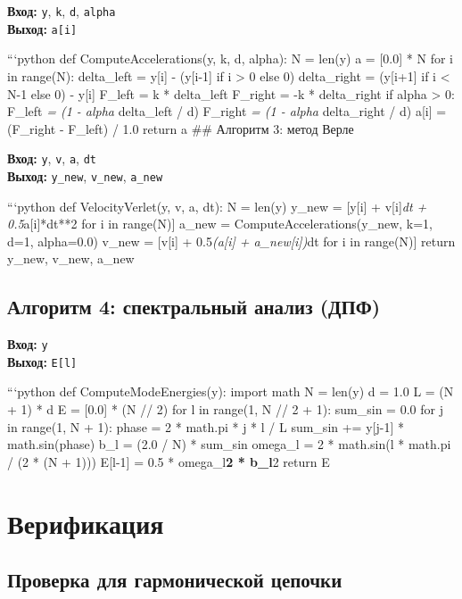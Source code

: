 \documentclass[
  12pt,
  a4paper,
  DIV=11,
  numbers=noendperiod]{scrreprt}
\begin{document}
\textbf{Вход:} \texttt{y}, \texttt{k}, \texttt{d}, \texttt{alpha}\\
\textbf{Выход:} \texttt{a{[}i{]}}

```python def ComputeAccelerations(y, k, d, alpha): N = len(y) a =
{[}0.0{]} * N for i in range(N): delta\_left = y{[}i{]} - (y{[}i-1{]} if
i \textgreater{} 0 else 0) delta\_right = (y{[}i+1{]} if i \textless{}
N-1 else 0) - y{[}i{]} F\_left = k * delta\_left F\_right = -k *
delta\_right if alpha \textgreater{} 0: F\_left \emph{= (1 - alpha }
delta\_left / d) F\_right \emph{= (1 - alpha } delta\_right / d)
a{[}i{]} = (F\_right - F\_left) / 1.0 return a \#\# Алгоритм 3: метод
Верле

\textbf{Вход:} \texttt{y}, \texttt{v}, \texttt{a}, \texttt{dt}\\
\textbf{Выход:} \texttt{y\_new}, \texttt{v\_new}, \texttt{a\_new}

```python def VelocityVerlet(y, v, a, dt): N = len(y) y\_new =
{[}y{[}i{]} + v{[}i{]}\emph{dt + 0.5}a{[}i{]}*dt**2 for i in range(N){]}
a\_new = ComputeAccelerations(y\_new, k=1, d=1, alpha=0.0) v\_new =
{[}v{[}i{]} + 0.5\emph{(a{[}i{]} + a\_new{[}i{]})}dt for i in
range(N){]} return y\_new, v\_new, a\_new

\section{Алгоритм 4: спектральный анализ
(ДПФ)}\label{ux430ux43bux433ux43eux440ux438ux442ux43c-4-ux441ux43fux435ux43aux442ux440ux430ux43bux44cux43dux44bux439-ux430ux43dux430ux43bux438ux437-ux434ux43fux444}

\textbf{Вход:} \texttt{y}\\
\textbf{Выход:} \texttt{E{[}l{]}}

```python def ComputeModeEnergies(y): import math N = len(y) d = 1.0 L =
(N + 1) * d E = {[}0.0{]} * (N // 2) for l in range(1, N // 2 + 1):
sum\_sin = 0.0 for j in range(1, N + 1): phase = 2 * math.pi * j * l / L
sum\_sin += y{[}j-1{]} * math.sin(phase) b\_l = (2.0 / N) * sum\_sin
omega\_l = 2 * math.sin(l * math.pi / (2 * (N + 1))) E{[}l-1{]} = 0.5 *
omega\_l\textbf{2 * b\_l}2 return E

\chapter{Верификация}\label{ux432ux435ux440ux438ux444ux438ux43aux430ux446ux438ux44f}

\section{Проверка для гармонической
цепочки}\label{ux43fux440ux43eux432ux435ux440ux43aux430-ux434ux43bux44f-ux433ux430ux440ux43cux43eux43dux438ux447ux435ux441ux43aux43eux439-ux446ux435ux43fux43eux447ux43aux438}
\end{document}
